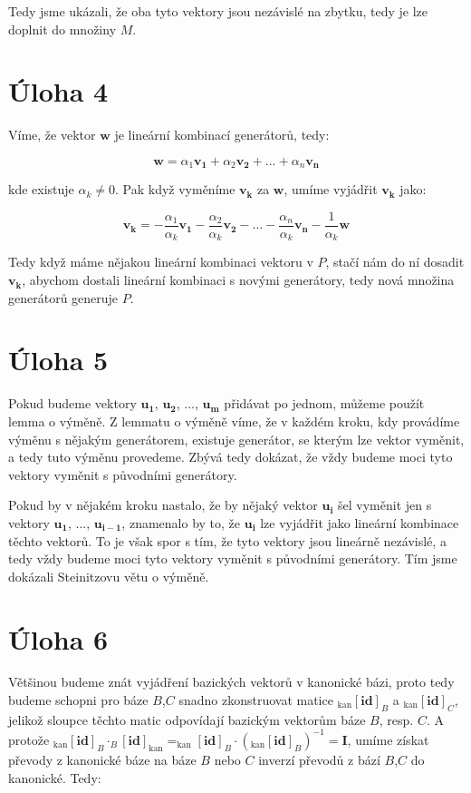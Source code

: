 \documentclass{fkssolpub}
\begin{document}
Tedy jsme ukázali, že oba tyto vektory jsou nezávislé na zbytku, tedy je lze doplnit do množiny $M$.

\section{Úloha 4}

Víme, že vektor $\mathbf{w}$ je lineární kombinací generátorů, tedy:

\[
  \mathbf{w} = \alpha_1 \mathbf{v_1} + \alpha_2 \mathbf{v_2} + \dots +\alpha_n \mathbf{v_n}
\]

kde existuje $\alpha_k \neq 0$. Pak když vyměníme $\mathbf{v_k}$ za $\mathbf{w}$, umíme vyjádřit $\mathbf{v_k}$ jako:

\[
  \mathbf{v_k} = -\frac{\alpha_1}{\alpha_k} \mathbf{v_1} - \frac{\alpha_2}{\alpha_k} \mathbf{v_2} - \dots - \frac{\alpha_n}{\alpha_k} \mathbf{v_n} - \frac{1}{\alpha_k} \mathbf{w}
\]

Tedy když máme nějakou lineární kombinaci vektoru v $P$, stačí nám do ní dosadit $\mathbf{v_k}$, abychom dostali lineární kombinaci s novými generátory, tedy nová množina generátorů generuje $P$.

\section{Úloha 5}

Pokud budeme vektory $\mathbf{u_1}$, $\mathbf{u_2}$, ..., $\mathbf{u_m}$ přidávat po jednom, můžeme použít lemma o výměně. Z lemmatu o výměně víme, že v každém kroku, kdy provádíme výměnu s nějakým generátorem, existuje generátor, se kterým lze vektor vyměnit, a tedy tuto výměnu provedeme. Zbývá tedy dokázat, že vždy budeme moci tyto vektory vyměnit s původními generátory.

Pokud by v nějakém kroku nastalo, že by nějaký vektor $\mathbf{u_i}$ šel vyměnit jen s vektory $\mathbf{u_1}$, ..., $\mathbf{u_{i - 1}}$, znamenalo by to, že $\mathbf{u_i}$ lze vyjádřit jako lineární kombinace těchto vektorů. To je však spor s tím, že tyto vektory jsou lineárně nezávislé, a tedy vždy budeme moci tyto vektory vyměnit s původními generátory. Tím jsme dokázali Steinitzovu větu o výměně.

\section{Úloha 6}

Většinou budeme znát vyjádření bazických vektorů v kanonické bázi, proto tedy budeme schopni pro báze $B$,$C$ snadno zkonstruovat matice $_{\text{kan}}[\mathbf{id}]_B$ a $_{\text{kan}}[\mathbf{id}]_C$, jelikož sloupce těchto matic odpovídají bazickým vektorům báze $B$, resp. $C$. A protože $_{\text{kan}}[\mathbf{id}]_B \cdot _{B}[\mathbf{id}]_{\text{kan}} = _{\text{kan}}[\mathbf{id}]_B \cdot (_{\text{kan}}[\mathbf{id}]_B)^{-1} = \mathbf{I}$, umíme získat převody z kanonické báze na báze $B$ nebo $C$ inverzí převodů z bází $B$,$C$ do kanonické. Tedy:
\end{document}
